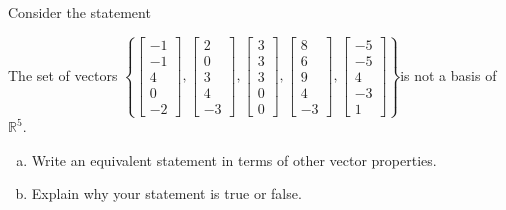 
\begin{exerciseStatement}


Consider the statement 
\begin{center}\begin{minipage}{0.8\textwidth}
 The set of vectors \( \left\{ \left[\begin{array}{c}
-1 \\
-1 \\
4 \\
0 \\
-2
\end{array}\right] , \left[\begin{array}{c}
2 \\
0 \\
3 \\
4 \\
-3
\end{array}\right] , \left[\begin{array}{c}
3 \\
3 \\
3 \\
0 \\
0
\end{array}\right] , \left[\begin{array}{c}
8 \\
6 \\
9 \\
4 \\
-3
\end{array}\right] , \left[\begin{array}{c}
-5 \\
-5 \\
4 \\
-3 \\
1
\end{array}\right] \right\} \)is not a basis of \(\mathbb{R}^5\). 
\end{minipage}\end{center}
    


\begin{enumerate}[(a)]
\item  Write an equivalent statement in terms of other vector properties.
\item  Explain why your statement is true or false.
\end{enumerate}
    
\end{exerciseStatement}
    
